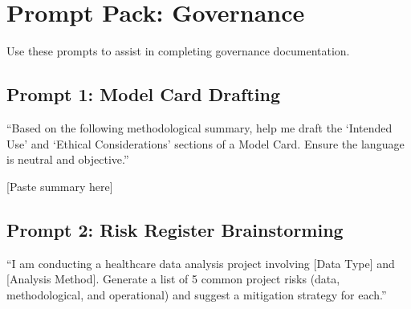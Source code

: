 \documentclass[
]{report}
\author{}
\date{}
\renewcommand*\contentsname{Table of contents}
\newcommand\contentsname{Table of contents}
\begin{document}
\renewcommand*\contentsname{Table of contents}
{
\hypersetup{linkcolor=}
\setcounter{tocdepth}{2}
\tableofcontents
}

\chapter{Prompt Pack: Governance}\label{prompt-pack-governance}

Use these prompts to assist in completing governance documentation.

\section{Prompt 1: Model Card
Drafting}\label{prompt-1-model-card-drafting}

``Based on the following methodological summary, help me draft the
`Intended Use' and `Ethical Considerations' sections of a Model Card.
Ensure the language is neutral and objective.''

{[}Paste summary here{]}

\section{Prompt 2: Risk Register
Brainstorming}\label{prompt-2-risk-register-brainstorming}

``I am conducting a healthcare data analysis project involving {[}Data
Type{]} and {[}Analysis Method{]}. Generate a list of 5 common project
risks (data, methodological, and operational) and suggest a mitigation
strategy for each.''
\end{document}
